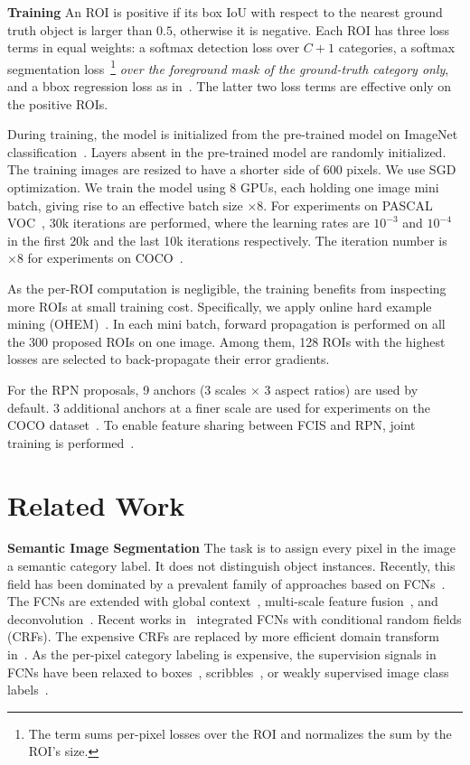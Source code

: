 \documentclass[10pt,twocolumn,letterpaper]{article}
\begin{document}
\textbf{Training}
An ROI is positive if its box IoU with respect to the nearest ground truth object is larger than $0.5$, otherwise it is negative. Each ROI has three loss terms in equal weights: a softmax detection loss over $C+1$ categories, a softmax segmentation loss~\footnote{The term sums per-pixel losses over the ROI and normalizes the sum by the ROI's size.} \emph{over the foreground mask of the ground-truth category only}, and a bbox regression loss as in~\cite{girshick2015fast}. The latter two loss terms are effective only on the positive ROIs.

During training, the model is initialized from the pre-trained model on ImageNet classification~\cite{he2016deep}. Layers absent in the pre-trained model are randomly initialized. The training images are resized to have a shorter side of 600 pixels. We use SGD optimization. We train the model using 8 GPUs, each holding one image mini batch, giving rise to an effective batch size $\times 8$. For experiments on PASCAL VOC~\cite{everingham2010pascal}, 30k iterations are performed, where the learning rates are $10^{-3}$ and $10^{-4}$ in the first 20k and the last 10k iterations respectively. The iteration number is $\times8$ for experiments on COCO~\cite{lin2014coco}.

As the per-ROI computation is negligible, the training benefits from inspecting more ROIs at small training cost. Specifically, we apply online hard example mining (OHEM)~\cite{shrivastava2016training}. In each mini batch, forward propagation is performed on all the 300 proposed ROIs on one image. Among them, 128 ROIs with the highest losses are selected to back-propagate their error gradients.

For the RPN proposals, 9 anchors (3 scales $\times$ 3 aspect ratios) are used by default. 3 additional anchors at a finer scale are used for experiments on the COCO dataset~\cite{lin2014coco}. To enable feature sharing between FCIS and RPN, joint training is performed~\cite{dai2016mnc,ren2016faster}.


\section{Related Work}

\textbf{Semantic Image Segmentation} The task is to assign every pixel in the image a semantic category label. It does not distinguish object instances. Recently, this field has been dominated by a prevalent family of approaches based on FCNs~\cite{long2015fully}. The FCNs are extended with global context~\cite{liu2016parsenet}, multi-scale feature fusion~\cite{chen2016attention}, and deconvolution~\cite{noh2015deconvolution}. Recent works in~\cite{chen2015semantic,zheng2015conditional,schwing2015fully,lin2016piecewise} integrated FCNs with conditional random fields (CRFs). The expensive CRFs are replaced by more efficient domain transform in~\cite{chen2016taskspecific}. As the per-pixel category labeling is expensive, the supervision signals in FCNs have been relaxed to boxes~\cite{dai2015boxsup}, scribbles~\cite{lin2016ScribbleSup}, or weakly supervised image class labels~\cite{hong2015decoupled,hong2016transferrable}.
\end{document}
